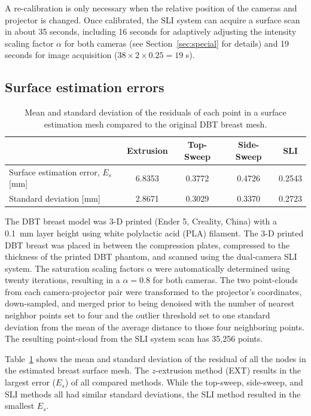 A re-calibration is only necessary when the relative position of the cameras and projector is changed. Once calibrated, the SLI system can acquire a surface scan in about 35 seconds, including 16 seconds for adaptively adjusting the intensity scaling factor $\alpha$ for both cameras (see Section~\ref{sec:special} for details) and 19 seconds for image acquisition ($38 \times 2\times 0.25 = 19$ s).

\subsection{Surface estimation errors}
\begin{table}
    \centering
    \caption{Mean and standard deviation of the residuals of each point in a surface estimation mesh compared to the original DBT breast mesh.}
        \begin{tabular}{lcccc}
        \toprule
         & Extrusion & Top-Sweep & Side-Sweep & SLI \\ \midrule
        Surface estimation error, $E_s$ [mm] & 6.8353 & 0.3772 & 0.4726 & \multicolumn{1}{l}{0.2543} \\
        Standard deviation [mm] & 2.8671 & 0.3029 & 0.3370 & 0.2723 \\ \bottomrule
        \end{tabular}%
    \label{tab:residuals}
\end{table}

The DBT breast model was 3-D printed (Ender 5, Creality, China) with a 0.1~mm layer height using white polylactic acid (PLA) filament. The 3-D printed DBT breast was placed in between the compression plates, compressed to the thickness of the printed DBT phantom, and scanned using the dual-camera SLI system. The saturation scaling factors $\alpha$ were automatically determined using twenty iterations, resulting in a $\alpha=0.8$ for both cameras. The two point-clouds from each camera-projector pair were transformed to the projector's coordinates, down-sampled, and merged prior to being denoised with the number of nearest neighbor points set to four and the outlier threshold set to one standard deviation from the mean of the average distance to those four neighboring points. The resulting point-cloud from the SLI system scan has 35,256 points.

Table~\ref{tab:residuals} shows the mean and standard deviation of the residual of all the nodes in the estimated breast surface mesh. The $z$-extrusion method (EXT) results in the largest error ($E_s$) of all compared methods. While the top-sweep, side-sweep, and SLI methods all had similar standard deviations, the SLI method resulted in the smallest $E_s$.

